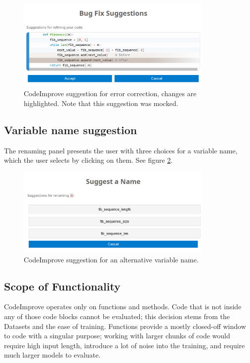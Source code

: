         \begin{figure}[ht!]
          \centering
          \includegraphics[width=0.85\textwidth]{obrazky-figures/codeimprove-bugfix.png}
          \caption{CodeImprove suggestion for error correction, changes are highlighted. Note that this suggestion was mocked.}
          \label{fig:vscode_errors}
        \end{figure}
        
        \subsection{Variable name suggestion}
            The renaming panel presents the user with three choices for a variable name, which the user selects by clicking on them. See figure \ref{fig:vscode_rename}.
        
        \begin{figure}[ht!]
          \centering
          \includegraphics[width=0.85\textwidth]{obrazky-figures/codeimprove-rename.png}
          \caption{CodeImprove suggestion for an alternative variable name.}
          \label{fig:vscode_rename}
        \end{figure}
        
        \subsection{Scope of Functionality}
            CodeImprove operates only on functions and methods. Code that is not inside any of those code blocks cannot be evaluated; this decision stems from the Datasets and the ease of training. Functions provide a mostly closed-off window to code with a singular purpose; working with larger chunks of code would require high input length, introduce a lot of noise into the training, and require much larger models to evaluate.
        
